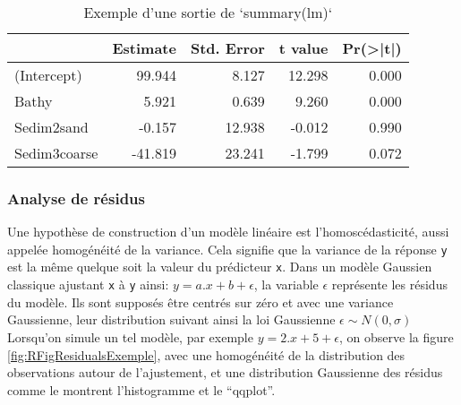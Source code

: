 \documentclass[french,a4paper]{article}
\begin{document}
\begin{table}[t]

\caption{\label{tab:RTableSummary}Exemple d'une sortie de `summary(lm)`}
\centering
\begin{tabular}{l|r|r|r|r}
\hline
  & Estimate & Std. Error & t value & Pr(>|t|)\\
\hline
(Intercept) & 99.944 & 8.127 & 12.298 & 0.000\\
\hline
Bathy & 5.921 & 0.639 & 9.260 & 0.000\\
\hline
Sedim2sand & -0.157 & 12.938 & -0.012 & 0.990\\
\hline
Sedim3coarse & -41.819 & 23.241 & -1.799 & 0.072\\
\hline
\end{tabular}
\end{table}

\hypertarget{analyse-de-residus}{%
\subsubsection{Analyse de résidus}\label{analyse-de-residus}}

Une hypothèse de construction d'un modèle linéaire est l'homoscédasticité, aussi appelée homogénéité de la variance. Cela signifie que la variance de la réponse \texttt{y} est la même quelque soit la valeur du prédicteur \texttt{x}. Dans un modèle Gaussien classique ajustant \texttt{x} à \texttt{y} ainsi: \(y = a.x + b + \epsilon\), la variable \(\epsilon\) représente les résidus du modèle. Ils sont supposés être centrés sur zéro et avec une variance Gaussienne, leur distribution suivant ainsi la loi Gaussienne \(\epsilon \sim N(0, \sigma)\)\\
Lorsqu'on simule un tel modèle, par exemple \(y = 2.x + 5 + \epsilon\), on observe la figure \ref{fig:RFigResidualsExemple}, avec une homogénéité de la distribution des observations autour de l'ajustement, et une distribution Gaussienne des résidus comme le montrent l'histogramme et le ``qqplot''.
\end{document}

